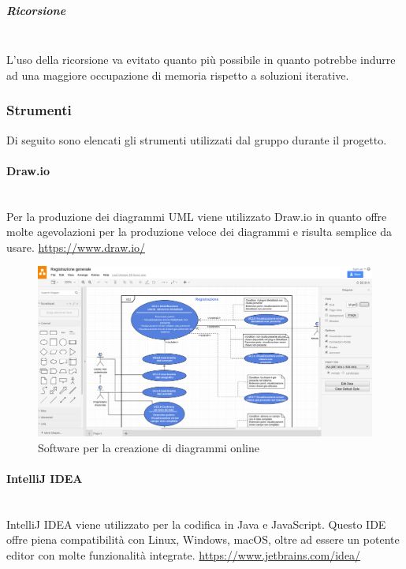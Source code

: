 			\subparagraph{Ricorsione} \mbox{}\\
			L'uso della ricorsione va evitato quanto più possibile in  quanto  potrebbe
			indurre  ad  una  maggiore  occupazione  di  memoria  rispetto  a  soluzioni
			iterative.
	\subsubsection{Strumenti}
	Di seguito sono elencati gli strumenti utilizzati dal gruppo durante il progetto.
		\paragraph{Draw.io} \mbox{}\\
		Per la produzione dei diagrammi UML viene utilizzato Draw.io in quanto offre molte agevolazioni per la produzione veloce dei diagrammi e risulta semplice da usare.
		\url{https://www.draw.io/}
		\begin{figure}[H]
			\includegraphics[width=0.99\linewidth]{res/images/drawio.png}
			\caption{Software per la creazione di diagrammi online}
		\end{figure} 
		\paragraph{IntelliJ IDEA} \mbox{}\\
		IntelliJ IDEA viene utilizzato per la codifica in Java e JavaScript. Questo IDE offre piena compatibilità con Linux, Windows, macOS, oltre ad essere un potente editor con molte funzionalità integrate.
		\url{https://www.jetbrains.com/idea/}


